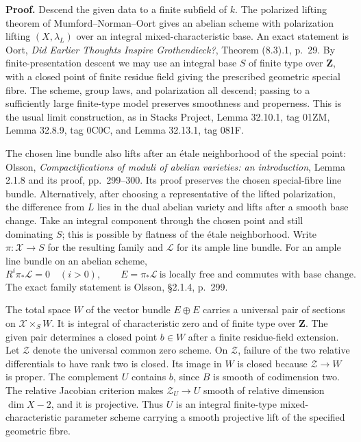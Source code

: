 \textbf{Proof.}
Descend the given data to a finite subfield of $k$. The polarized
lifting theorem of Mumford--Norman--Oort gives an abelian scheme
with polarization lifting $(X,\lambda_L)$ over an integral
mixed-characteristic base. An exact statement is Oort,
\emph{Did Earlier Thoughts Inspire Grothendieck?}, Theorem (8.3).1,
p.~29. By finite-presentation descent we may use an integral base
$S$ of finite type over $\mathbf Z$, with a closed point of finite
residue field giving the prescribed geometric special fibre. The
scheme, group laws, and polarization all descend; passing to a
sufficiently large finite-type model preserves smoothness and
properness. This is the usual limit construction, as in Stacks
Project, Lemma 32.10.1, tag 01ZM, Lemma 32.8.9, tag 0C0C,
and Lemma 32.13.1, tag 081F.

The chosen line bundle also lifts after an \'etale neighborhood of
the special point: Olsson, \emph{Compactifications of moduli of
abelian varieties: an introduction}, Lemma 2.1.8 and its proof,
pp.~299--300. Its proof preserves the chosen special-fibre line
bundle. Alternatively, after choosing a representative of the
lifted polarization, the difference from $L$ lies in the dual
abelian variety and lifts after a smooth base change. Take an
integral component through the chosen point and still dominating
$S$; this is possible by flatness of the \'etale neighborhood.
Write $\pi:\mathcal X\to S$ for the resulting family and
$\mathcal L$ for its ample line bundle. For an ample line bundle
on an abelian scheme,
\[
 R^i\pi_*\mathcal L=0\quad(i>0),\qquad
 E=\pi_*\mathcal L\ \text{is locally free and commutes with base change}.
\]
The exact family statement is Olsson, \S2.1.4, p.~299.

The total space $W$ of the vector bundle $E\oplus E$ carries a
universal pair of sections on $\mathcal X\times_S W$. It is
integral of characteristic zero and of finite type over
$\mathbf Z$. The given pair determines a closed point $b\in W$
after a finite residue-field extension. Let $\mathcal Z$ denote
the universal common zero scheme. On $\mathcal Z$, failure of the
two relative differentials to have rank two is closed. Its image
in $W$ is closed because $\mathcal Z\to W$ is proper. The
complement $U$ contains $b$, since $B$ is smooth of codimension
two. The relative Jacobian criterion makes $\mathcal Z_U\to U$
smooth of relative dimension $\dim X-2$, and it is projective.
Thus $U$ is an integral finite-type mixed-characteristic
parameter scheme carrying a smooth projective lift of the
specified geometric fibre.

